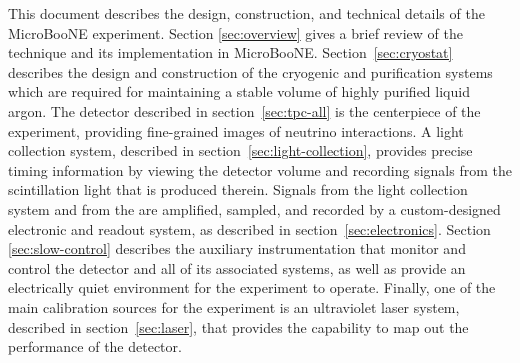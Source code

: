 This document describes the design, construction, and technical details of the MicroBooNE experiment.  Section \ref{sec:overview} gives a brief review of the \lartpc technique and its implementation in MicroBooNE.  Section~\ref{sec:cryostat} describes the design and construction of the cryogenic and purification systems which are required for maintaining a stable volume of highly purified liquid argon.  The \lartpc detector described in section~\ref{sec:tpc-all} is the centerpiece of the experiment, providing fine-grained images of neutrino interactions.  A light collection system, described in section~\ref{sec:light-collection}, provides precise timing information by viewing the detector volume and recording signals from the scintillation light that is produced therein. Signals from the light collection system and from the \lartpc are amplified, sampled, and recorded by a custom-designed electronic and readout system, as described in section~\ref{sec:electronics}.  Section \ref{sec:slow-control} describes the auxiliary instrumentation that monitor and control the detector and all of its associated systems, as well as provide an electrically quiet environment for the experiment to operate. Finally, one of the main calibration sources for the experiment is an ultraviolet laser system, described in section~\ref{sec:laser}, that provides the capability to map out the performance of the \lartpc detector.

